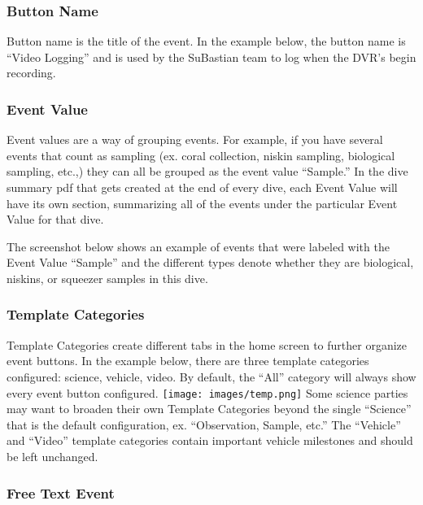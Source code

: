 \documentclass[
  letterpaper,
  DIV=11,
  numbers=noendperiod]{scrreprt}
\begin{document}
\hypertarget{button-name}{%
\subsubsection{Button Name}\label{button-name}}

Button name is the title of the event. In the example below, the button
name is ``Video Logging'' and is used by the SuBastian team to log when
the DVR's begin recording.

\hypertarget{event-value}{%
\subsubsection{Event Value}\label{event-value}}

Event values are a way of grouping events. For example, if you have
several events that count as sampling (ex. coral collection, niskin
sampling, biological sampling, etc.,) they can all be grouped as the
event value ``Sample.'' In the dive summary pdf that gets created at the
end of every dive, each Event Value will have its own section,
summarizing all of the events under the particular Event Value for that
dive.

The screenshot below shows an example of events that were labeled with
the Event Value ``Sample'' and the different types denote whether they
are biological, niskins, or squeezer samples in this dive.

\hypertarget{template-categories}{%
\subsubsection{Template Categories}\label{template-categories}}

Template Categories create different tabs in the home screen to further
organize event buttons. In the example below, there are three template
categories configured: science, vehicle, video. By default, the ``All''
category will always show every event button configured.
\texttt{[image: images/temp.png]} Some science parties may want to
broaden their own Template Categories beyond the single ``Science'' that
is the default configuration, ex. ``Observation, Sample, etc.'' The
``Vehicle'' and ``Video'' template categories contain important vehicle
milestones and should be left unchanged.

\hypertarget{free-text-event}{%
\subsubsection{Free Text Event}\label{free-text-event}}
\end{document}
